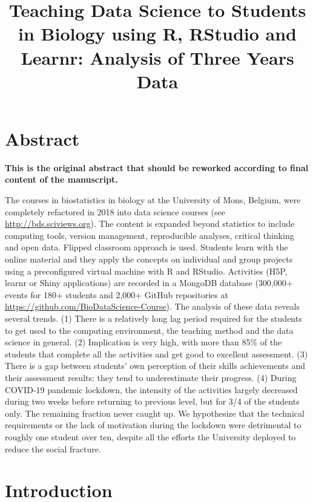 \documentclass[
]{article}
\title{Teaching Data Science to Students in Biology using R, RStudio and
Learnr: Analysis of Three Years Data}
\author{}
\date{\vspace{-2.5em}}
\begin{document}
\maketitle

\hypertarget{abstract}{%
\section{Abstract}\label{abstract}}

\textbf{This is the original abstract that should be reworked according
to final content of the manuscript.}

The courses in biostatistics in biology at the University of Mons,
Belgium, were completely refactored in 2018 into data science courses
(see \url{http://bds.sciviews.org}). The content is expanded beyond
statistics to include computing tools, version management, reproducible
analyses, critical thinking and open data. Flipped classroom approach is
used. Students learn with the online material and they apply the
concepts on individual and group projects using a preconfigured virtual
machine with R and RStudio. Activities (H5P, learnr or Shiny
applications) are recorded in a MongoDB database (300,000+ events for
180+ students and 2,000+ GitHub repositories at
\url{https://github.com/BioDataScience-Course}). The analysis of these
data reveals several trends. (1) There is a relatively long lag period
required for the students to get used to the computing environment, the
teaching method and the data science in general. (2) Implication is very
high, with more than 85\% of the students that complete all the
activities and get good to excellent assessment. (3) There is a gap
between students' own perception of their skills achievements and their
assessment results: they tend to underestimate their progress. (4)
During COVID-19 pandemic lockdown, the intensity of the activities
largely decreased during two weeks before returning to previous level,
but for 3/4 of the students only. The remaining fraction never caught
up. We hypothesize that the technical requirements or the lack of
motivation during the lockdown were detrimental to roughly one student
over ten, despite all the efforts the University deployed to reduce the
social fracture.

\hypertarget{introduction}{%
\section{Introduction}\label{introduction}}
\end{document}
